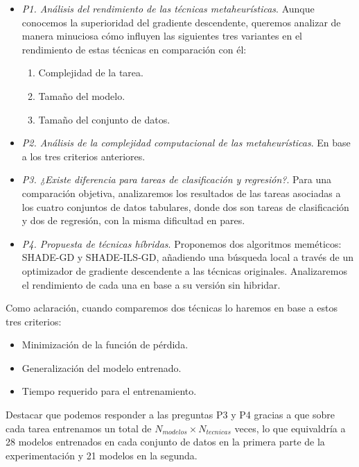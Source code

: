 \begin{itemize}


\item \textit{P1. Análisis del rendimiento de las técnicas metaheurísticas}. Aunque conocemos la superioridad del gradiente descendente, queremos analizar de manera minuciosa cómo influyen las siguientes tres variantes en el rendimiento de estas técnicas en comparación con él:
	
	\begin{enumerate}
		\item Complejidad de la tarea.
		
		\item Tamaño del modelo.
		
		\item Tamaño del conjunto de datos.
	\end{enumerate}

\item \textit{P2. Análisis de la complejidad computacional de las metaheurísticas}. En base a los tres criterios anteriores.

\item \textit{P3. ¿Existe diferencia para tareas de clasificación y regresión?}. Para una comparación objetiva, analizaremos los resultados de las tareas asociadas a los cuatro conjuntos de datos tabulares, donde dos son tareas de clasificación y dos de regresión, con la misma dificultad en pares.



\item \textit{P4. Propuesta de técnicas híbridas}. Proponemos dos algoritmos meméticos: SHADE-GD y SHADE-ILS-GD, añadiendo una búsqueda local a través de un optimizador de gradiente descendente a las técnicas originales. Analizaremos el rendimiento de cada una en base a su versión sin hibridar.

\end{itemize}

Como aclaración, cuando comparemos dos técnicas lo haremos en base a estos tres criterios:

\begin{itemize}
	\item Minimización de la función de pérdida.
	
	\item Generalización del modelo entrenado.
	
	\item Tiempo requerido para el entrenamiento.
\end{itemize}	
	
Destacar que podemos responder a las preguntas P3 y P4 gracias a que sobre cada tarea entrenamos un total de $N_{modelos} \times N_{tecnicas}$ veces, lo que equivaldría a 28 modelos entrenados en cada conjunto de datos en la primera parte de la experimentación y 21 modelos en la segunda.